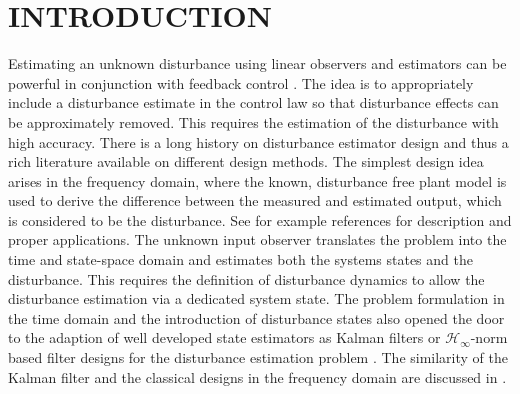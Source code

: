 \documentclass[graybox]{svmult}
\begin{document}



\section{INTRODUCTION}
Estimating an unknown disturbance using linear observers and estimators can be  powerful in conjunction with feedback control \cite{Franklin02}. The idea is to appropriately include a disturbance estimate in the control law so that disturbance effects can be approximately removed. This requires the estimation of the disturbance with high accuracy. There is a long history on disturbance estimator design and thus a rich literature available on different design methods. 
The simplest design idea arises in the frequency domain, where the known, disturbance free plant model is used to derive the difference between the measured and estimated output, which is considered to be the disturbance. See for example references  \cite{Schrijver02, hori92} for description and proper applications. 
The unknown input observer \cite{Hostetter73, Basile69, Gourishangkar77} translates the problem into the time and state-space domain and estimates both the systems states and the disturbance. This  requires the definition of disturbance dynamics to allow the disturbance estimation via  a dedicated system state.
The problem formulation in the time domain and the introduction of disturbance states also opened the door to the adaption of well developed state estimators as Kalman filters or  $\mathcal{H}_\infty$-norm based filter designs for the disturbance estimation problem
\cite{Wang04}. The similarity of the Kalman filter and the classical designs in the frequency domain are discussed in \cite{Schrijvert00}.


\end{document}

